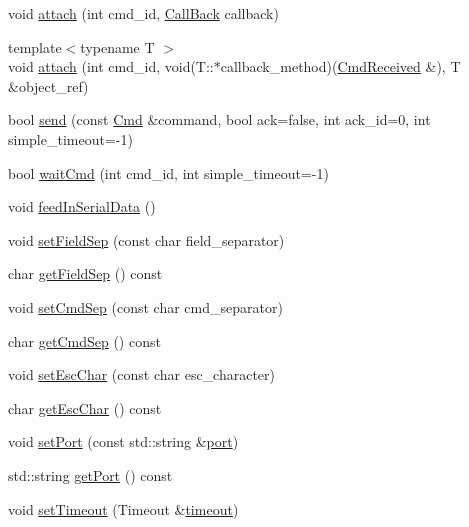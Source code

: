 \begin{DoxyCompactItemize}
void \hyperlink{classcmd_1_1_cmd_messenger_abbc2aa2a6bc95960215eeaa88c4533a4}{attach} (int cmd\+\_\+id, \hyperlink{namespacecmd_a20b40ecd3ba46130eef6c125f70c4121}{Call\+Back} callback)
\item 
{\footnotesize template$<$typename T $>$ }\\void \hyperlink{classcmd_1_1_cmd_messenger_a8f50f00a66e6d40ed5ee2234b424e9a9}{attach} (int cmd\+\_\+id, void(T\+::$\ast$callback\+\_\+method)(\hyperlink{classcmd_1_1_cmd_received}{Cmd\+Received} \&), T \&object\+\_\+ref)
\item 
bool \hyperlink{classcmd_1_1_cmd_messenger_a5ea6815a9c6dad49350396839527e25d}{send} (const \hyperlink{namespacecmd_af9b58ca395c80edd1335e21d1b9f4c99}{Cmd} \&command, bool ack=false, int ack\+\_\+id=0, int simple\+\_\+timeout=-\/1)
\item 
bool \hyperlink{classcmd_1_1_cmd_messenger_a40c20df2763d3af8e59a7c135a82e121}{wait\+Cmd} (int cmd\+\_\+id, int simple\+\_\+timeout=-\/1)
\item 
void \hyperlink{classcmd_1_1_cmd_messenger_a3257cf2b159a2b3d8754b701865c743d}{feed\+In\+Serial\+Data} ()
\item 
void \hyperlink{classcmd_1_1_cmd_messenger_af83fbed5873f5e517a0432438dd7c873}{set\+Field\+Sep} (const char field\+\_\+separator)
\item 
char \hyperlink{classcmd_1_1_cmd_messenger_a84895ecc82e2302891b119887944a308}{get\+Field\+Sep} () const 
\item 
void \hyperlink{classcmd_1_1_cmd_messenger_afebb6b63ae64c661b680597ef29bc879}{set\+Cmd\+Sep} (const char cmd\+\_\+separator)
\item 
char \hyperlink{classcmd_1_1_cmd_messenger_acfa9dda9411bc8943973abd5f5f6156f}{get\+Cmd\+Sep} () const 
\item 
void \hyperlink{classcmd_1_1_cmd_messenger_ada69819065773ffc3c4923517321d6e5}{set\+Esc\+Char} (const char esc\+\_\+character)
\item 
char \hyperlink{classcmd_1_1_cmd_messenger_adf36d1a1b153793d9bf33f14b26167a5}{get\+Esc\+Char} () const 
\item 
void \hyperlink{classcmd_1_1_cmd_messenger_ab95dce49fc8845498c71bae25987a923}{set\+Port} (const std\+::string \&\hyperlink{interbyte_8cpp_aae3ba4688e12d52dca80a55b5725b29d}{port})
\item 
std\+::string \hyperlink{classcmd_1_1_cmd_messenger_ab2ebaaabdfeb83decbc868b556a1ea0b}{get\+Port} () const 
\item 
void \hyperlink{classcmd_1_1_cmd_messenger_a0ccea65cba7a807bdf4c476f8db9289a}{set\+Timeout} (Timeout \&\hyperlink{interbyte_8cpp_ab5627d8d8b095c198e2523c44ca380ac}{timeout})

\end{DoxyCompactItemize}

